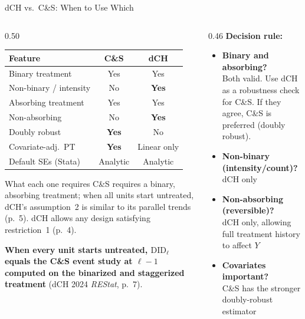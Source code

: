 \documentclass[main.tex]{subfiles}
\begin{document}
\begin{frame}{dCH vs.\ C\&S: When to Use Which}

  \begin{columns}[T]
    \begin{column}{0.50\textwidth}
      \footnotesize
      \begin{tabular}{lcc}
        \toprule
        \textbf{Feature} & \textbf{C\&S} & \textbf{dCH} \\
        \midrule
        Binary treatment     & Yes & Yes \\
        Non-binary / intensity & No  & \textbf{Yes} \\
        Absorbing treatment  & Yes & Yes \\
        Non-absorbing        & No  & \textbf{Yes} \\
        Doubly robust        & \textbf{Yes} & No \\
        Covariate-adj.\ PT   & \textbf{Yes} & Linear only \\
        Default SEs (Stata)  & Analytic & Analytic \\
        \bottomrule
      \end{tabular}

      \smallskip
      \begin{block}{\footnotesize What each one requires}
        \footnotesize
        C\&S requires a binary, absorbing treatment; when all units start
        untreated, dCH's assumption~2 is similar to its parallel trends (p.~5).
        dCH allows any design satisfying restriction~1 (p.~4).

        \smallskip
        \textbf{When every unit starts untreated, $\text{DID}_\ell$ equals
        the C\&S event study at $\ell-1$ computed on the binarized and
        staggerized treatment} (dCH 2024 \textit{REStat}, p.~7).
      \end{block}
    \end{column}
    \begin{column}{0.46\textwidth}
      \textbf{Decision rule:}
      \begin{itemize}
        \item \textbf{Binary and absorbing?}\\
          Both valid. Use dCH as a robustness check
          for C\&S. If they agree, C\&S is preferred
          (doubly robust).
        \item \textbf{Non-binary (intensity/count)?}\\
          \alert{dCH only}
        \item \textbf{Non-absorbing (reversible)?}\\
          \alert{dCH only}, allowing full treatment
          history to affect $Y$
        \item \textbf{Covariates important?}\\
          C\&S has the stronger doubly-robust estimator
      \end{itemize}
    \end{column}
  \end{columns}

\end{frame}
\end{document}
